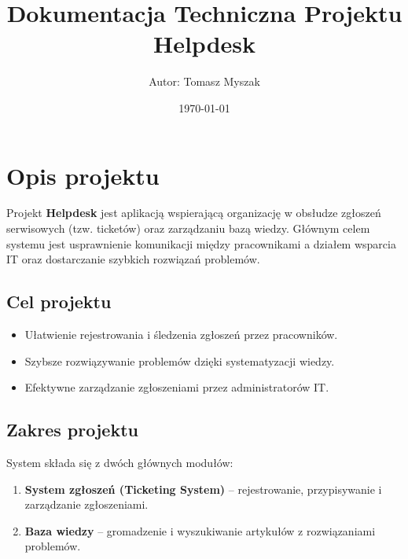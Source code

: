 \documentclass[a4paper,12pt]{article}
\title{\textbf{Dokumentacja Techniczna Projektu Helpdesk}}
\author{Autor: Tomasz Myszak}
\date{\today}
\begin{document}
\maketitle

\tableofcontents
\newpage

\section{Opis projektu}
Projekt \textbf{Helpdesk} jest aplikacją wspierającą organizację w obsłudze zgłoszeń serwisowych (tzw. ticketów) oraz zarządzaniu bazą wiedzy. Głównym celem systemu jest usprawnienie komunikacji między pracownikami a działem wsparcia IT oraz dostarczanie szybkich rozwiązań problemów.

\subsection{Cel projektu}
\begin{itemize}
    \item Ułatwienie rejestrowania i śledzenia zgłoszeń przez pracowników.
    \item Szybsze rozwiązywanie problemów dzięki systematyzacji wiedzy.
    \item Efektywne zarządzanie zgłoszeniami przez administratorów IT.
\end{itemize}

\subsection{Zakres projektu}
System składa się z dwóch głównych modułów:
\begin{enumerate}
    \item \textbf{System zgłoszeń (Ticketing System)} -- rejestrowanie, przypisywanie i zarządzanie zgłoszeniami.
    \item \textbf{Baza wiedzy} -- gromadzenie i wyszukiwanie artykułów z rozwiązaniami problemów.
\end{enumerate}

\newpage

\end{document}
